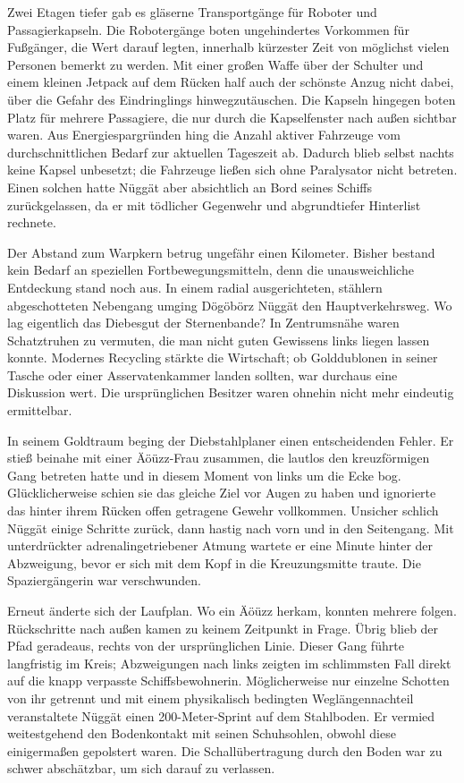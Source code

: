 Zwei Etagen tiefer gab es gläserne Transportgänge für Roboter und Passagierkapseln. Die Robotergänge boten ungehindertes Vorkommen für Fußgänger, die Wert darauf legten, innerhalb kürzester Zeit von möglichst vielen Personen bemerkt zu werden. Mit einer großen Waffe über der Schulter und einem kleinen Jetpack auf dem Rücken half auch der schönste Anzug nicht dabei, über die Gefahr des Eindringlings hinwegzutäuschen. Die Kapseln hingegen boten Platz für mehrere Passagiere, die nur durch die Kapselfenster nach außen sichtbar waren. Aus Energiespargründen hing die Anzahl aktiver Fahrzeuge vom durchschnittlichen Bedarf zur aktuellen Tageszeit ab. Dadurch blieb selbst nachts keine Kapsel unbesetzt; die Fahrzeuge ließen sich ohne Paralysator nicht betreten. Einen solchen hatte Nüggät aber absichtlich an Bord seines Schiffs zurückgelassen, da er mit tödlicher Gegenwehr und abgrundtiefer Hinterlist rechnete.

Der Abstand zum Warpkern betrug ungefähr einen Kilometer. Bisher bestand kein Bedarf an speziellen Fortbewegungsmitteln, denn die unausweichliche Entdeckung stand noch aus. In einem radial ausgerichteten, stählern abgeschotteten Nebengang umging Dögöbörz Nüggät den Hauptverkehrsweg. Wo lag eigentlich das Diebesgut der Sternenbande? In Zentrumsnähe waren Schatztruhen zu vermuten, die man nicht guten Gewissens links liegen lassen konnte. Modernes Recycling stärkte die Wirtschaft; ob Golddublonen in seiner Tasche oder einer Asservatenkammer landen sollten, war durchaus eine Diskussion wert. Die ursprünglichen Besitzer waren ohnehin nicht mehr eindeutig ermittelbar.

In seinem Goldtraum beging der Diebstahlplaner einen entscheidenden Fehler. Er stieß beinahe mit einer Äöüzz-Frau zusammen, die lautlos den kreuzförmigen Gang betreten hatte und in diesem Moment von links um die Ecke bog. Glücklicherweise schien sie das gleiche Ziel vor Augen zu haben und ignorierte das hinter ihrem Rücken offen getragene Gewehr vollkommen. Unsicher schlich Nüggät einige Schritte zurück, dann hastig nach vorn und in den Seitengang. Mit unterdrückter adrenalingetriebener Atmung wartete er eine Minute hinter der Abzweigung, bevor er sich mit dem Kopf in die Kreuzungsmitte traute. Die Spaziergängerin war verschwunden.

Erneut änderte sich der Laufplan. Wo ein Äöüzz herkam, konnten mehrere folgen. Rückschritte nach außen kamen zu keinem Zeitpunkt in Frage. Übrig blieb der Pfad geradeaus, rechts von der ursprünglichen Linie. Dieser Gang führte langfristig im Kreis; Abzweigungen nach links zeigten im schlimmsten Fall direkt auf die knapp verpasste Schiffsbewohnerin. Möglicherweise nur einzelne Schotten von ihr getrennt und mit einem physikalisch bedingten Weglängennachteil veranstaltete Nüggät einen 200-Meter-Sprint auf dem Stahlboden. Er vermied weitestgehend den Bodenkontakt mit seinen Schuhsohlen, obwohl diese einigermaßen gepolstert waren. Die Schallübertragung durch den Boden war zu schwer abschätzbar, um sich darauf zu verlassen.


